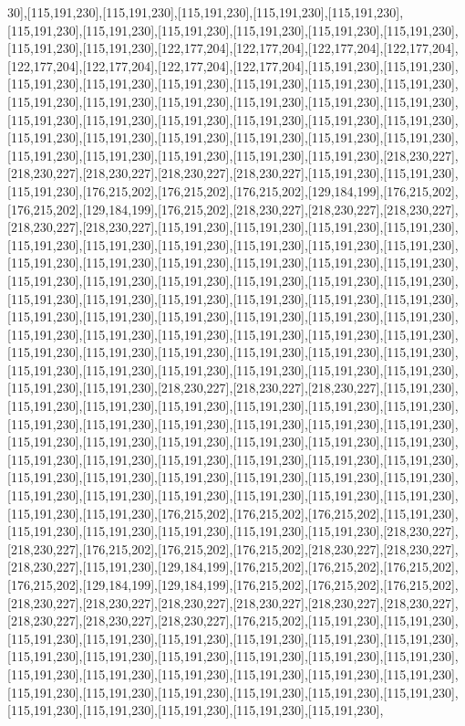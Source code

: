 30],[115,191,230],[115,191,230],[115,191,230],[115,191,230],[115,191,230],[115,191,230],[115,191,230],[115,191,230],[115,191,230],[115,191,230],[115,191,230],[115,191,230],[115,191,230],[122,177,204],[122,177,204],[122,177,204],[122,177,204],[122,177,204],[122,177,204],[122,177,204],[122,177,204],[115,191,230],[115,191,230],[115,191,230],[115,191,230],[115,191,230],[115,191,230],[115,191,230],[115,191,230],[115,191,230],[115,191,230],[115,191,230],[115,191,230],[115,191,230],[115,191,230],[115,191,230],[115,191,230],[115,191,230],[115,191,230],[115,191,230],[115,191,230],[115,191,230],[115,191,230],[115,191,230],[115,191,230],[115,191,230],[115,191,230],[115,191,230],[115,191,230],[115,191,230],[115,191,230],[115,191,230],[218,230,227],[218,230,227],[218,230,227],[218,230,227],[218,230,227],[115,191,230],[115,191,230],[115,191,230],[176,215,202],[176,215,202],[176,215,202],[129,184,199],[176,215,202],[176,215,202],[129,184,199],[176,215,202],[218,230,227],[218,230,227],[218,230,227],[218,230,227],[218,230,227],[115,191,230],[115,191,230],[115,191,230],[115,191,230],[115,191,230],[115,191,230],[115,191,230],[115,191,230],[115,191,230],[115,191,230],[115,191,230],[115,191,230],[115,191,230],[115,191,230],[115,191,230],[115,191,230],[115,191,230],[115,191,230],[115,191,230],[115,191,230],[115,191,230],[115,191,230],[115,191,230],[115,191,230],[115,191,230],[115,191,230],[115,191,230],[115,191,230],[115,191,230],[115,191,230],[115,191,230],[115,191,230],[115,191,230],[115,191,230],[115,191,230],[115,191,230],[115,191,230],[115,191,230],[115,191,230],[115,191,230],[115,191,230],[115,191,230],[115,191,230],[115,191,230],[115,191,230],[115,191,230],[115,191,230],[115,191,230],[115,191,230],[115,191,230],[115,191,230],[115,191,230],[115,191,230],[115,191,230],[218,230,227],[218,230,227],[218,230,227],[115,191,230],[115,191,230],[115,191,230],[115,191,230],[115,191,230],[115,191,230],[115,191,230],[115,191,230],[115,191,230],[115,191,230],[115,191,230],[115,191,230],[115,191,230],[115,191,230],[115,191,230],[115,191,230],[115,191,230],[115,191,230],[115,191,230],[115,191,230],[115,191,230],[115,191,230],[115,191,230],[115,191,230],[115,191,230],[115,191,230],[115,191,230],[115,191,230],[115,191,230],[115,191,230],[115,191,230],[115,191,230],[115,191,230],[115,191,230],[115,191,230],[115,191,230],[115,191,230],[115,191,230],[115,191,230],[176,215,202],[176,215,202],[176,215,202],[115,191,230],[115,191,230],[115,191,230],[115,191,230],[115,191,230],[115,191,230],[218,230,227],[218,230,227],[176,215,202],[176,215,202],[176,215,202],[218,230,227],[218,230,227],[218,230,227],[115,191,230],[129,184,199],[176,215,202],[176,215,202],[176,215,202],[176,215,202],[129,184,199],[129,184,199],[176,215,202],[176,215,202],[176,215,202],[218,230,227],[218,230,227],[218,230,227],[218,230,227],[218,230,227],[218,230,227],[218,230,227],[218,230,227],[218,230,227],[176,215,202],[115,191,230],[115,191,230],[115,191,230],[115,191,230],[115,191,230],[115,191,230],[115,191,230],[115,191,230],[115,191,230],[115,191,230],[115,191,230],[115,191,230],[115,191,230],[115,191,230],[115,191,230],[115,191,230],[115,191,230],[115,191,230],[115,191,230],[115,191,230],[115,191,230],[115,191,230],[115,191,230],[115,191,230],[115,191,230],[115,191,230],[115,191,230],[115,191,230],[115,191,230],[115,191,230],[115,191,230],
